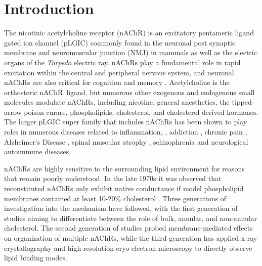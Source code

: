 \documentclass[final,3p,times,twocolumn]{elsarticle}
\newcommand{\nachr}{nAChR}
\begin{document}
\section{Introduction}
\label{S:1}

The nicotinic acetylcholine receptor (nAChR) is an excitatory pentameric ligand gated ion channel (pLGIC) commonly found in the neuronal post synaptic membrane and neuromuscular junction (NMJ) in mammals 
as well as the electric organs of the \textit{Torpedo} electric ray. 
nAChRs play a fundamental role in rapid excitation within the central and peripheral nervous system, and neuronal nAChRs are also critical for cognition and memory \cite{Dani2001b, Changeux2015}. Acetylcholine is the orthosteric \nachr~ligand, but numerous other exogenous and endogenous small molecules modulate \nachr s, including nicotine, general anesthetics, the tipped-arrow poison curare,  phospholipids, cholesterol, and cholesterol-derived hormones.\cite{Klaassen2015,Taly2009}  
The larger pLGIC super family that includes \nachr s has been shown to play roles in numerous diseases related to inflammation, \cite{Patel2017,Yocum2017,Cornelison2016}, addiction \cite{Cornelison2016}, chronic pain \cite{Xiong2012}, Alzheimer's Disease \cite{Walstab2010,Picciotto_Neuroprotection_2008,MartinRuiz_4_1999}, spinal muscular atrophy \cite{Arnold_Reduced_2004}, schizophrenia \cite{Haydar2010} and neurological autoimmune diseases \cite{Lennon_Immunization_2003}.

nAChRs are highly sensitive to the surrounding lipid environment\cite{Hamouda2006a,Baenziger2017,Padilla-Morales2016,Barrantes2007} for reasons that remain poorly understood. In the late 1970s it was observed that reconstituted \nachr s only exhibit native conductance if model phospholipid membranes contained at least 10-20\% cholesterol
\cite{Dalziel1980,Criado1982,Ochoa1983}. Three generations of investigation into the mechanism have followed, with the first generation of studies\cite{Marsh1978,Dalziel1980,Marsh1981,Criado1982,Gonzalez-Ros1982,McNamee1982,Ellena1983,Ochoa1983,Zabrecky1985,Bristow1987,Leibel1987,Middlemas1987,Jones1988a,Jones1988, Fong1986,Fong1987,McNamee1988, Barrantes1989,Sunshine1992,Sunshine1994,Narayanaswami1993,Addona1998,Corbin1998,Barrantes2000} aiming to differentiate between the role of bulk, annular, and non-annular cholesterol. The second generation\cite{Baenziger2015,Bruses2001,Marchand2002,Oshikawa2003,Pato2008,Zhu2006,Baenziger2017, Barrantes2007,Barrantes2000,Barrantes2010,Bermudez2010,Perillo2016,Wenz2005,Borroni2016, Unwin2017} of studies probed membrane-mediated effects on organization of multiple \nachr s, while the third generation\cite{Basak2017,Althoff2014,Laverty2017,Zhu2018} has applied x-ray crystallography and high-resolution cryo electron microscopy to directly observe lipid binding modes. 
\end{document}
